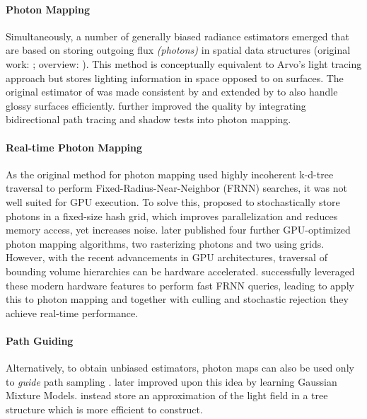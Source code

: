 \paragraph{Photon Mapping}
Simultaneously, a number of generally biased radiance estimators emerged that are based on storing outgoing flux \emph{(photons)} in spatial data structures (original work: \cite{jensen1996}; overview: \cite{kang2016}).
This method is conceptually equivalent to Arvo's light tracing approach \parencite{arvo1986} but stores lighting information in space opposed to on surfaces.
The original estimator of \textcite{jensen1996} was made consistent by \textcite{hachisuka2008,knaus2011} and extended by \textcite{hachisuka2009a} to also handle glossy surfaces efficiently.
\textcite{georgiev2012} further improved the quality by integrating bidirectional path tracing and shadow tests into photon mapping.

\paragraph{Real-time Photon Mapping}
As the original method for photon mapping \parencite{jensen1996} used highly incoherent k-d-tree traversal to perform Fixed-Radius-Near-Neighbor (FRNN) searches, it was not well suited for GPU execution.
To solve this, \textcite{hachisuka2010} proposed to stochastically store photons in a fixed-size hash grid, which improves parallelization and reduces memory access, yet increases noise.
\textcite{mara2013} later published four further GPU-optimized photon mapping algorithms, two rasterizing photons and two using grids.
However, with the recent advancements in GPU architectures, traversal of bounding volume hierarchies can be hardware accelerated.
\textcite{evangelou2021} successfully leveraged these modern hardware features to perform fast FRNN queries, leading \textcite{kern2023} to apply this to photon mapping and together with culling and stochastic rejection they achieve real-time performance.

\paragraph{Path Guiding}
Alternatively, to obtain unbiased estimators, photon maps \parencite{jensen1996} can also be used only to \emph{guide} path sampling \parencite{jensen1995}.
\textcite{vorba2014} later improved upon this idea by learning Gaussian Mixture Models.
\textcite{muller2017} instead store an approximation of the light field in a tree structure which is more efficient to construct.

